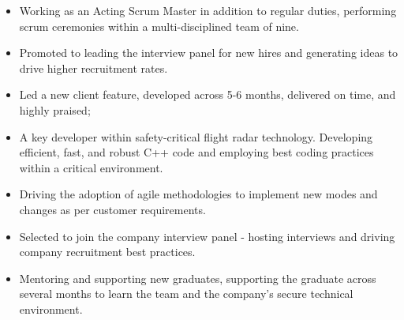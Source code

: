 \documentclass[8pt,a4paper]{altacv}
\begin{document}

\begin{fullwidth}
\makecvheader
\end{fullwidth}

\begin{itemize}

\item Working as an Acting Scrum Master in addition to regular duties, performing scrum ceremonies within a multi-disciplined team of nine.
\item Promoted to leading the interview panel for new hires and generating ideas to drive higher recruitment rates.

\divider
\end{itemize}

\begin{itemize}

\item Led a new client feature, developed across 5-6 months, delivered on time, and highly praised;
\item A key developer within safety-critical flight radar technology. Developing efficient, fast, and robust C++ code and employing best coding practices within a critical environment. 
\item Driving the adoption of agile methodologies to implement new modes and changes as per customer requirements.
\item Selected to join the company interview panel - hosting interviews and driving company recruitment best practices.
\item Mentoring and supporting new graduates,  supporting the graduate across several months to learn the team and the company's secure technical environment.

\divider
\end{itemize}
\end{document}
